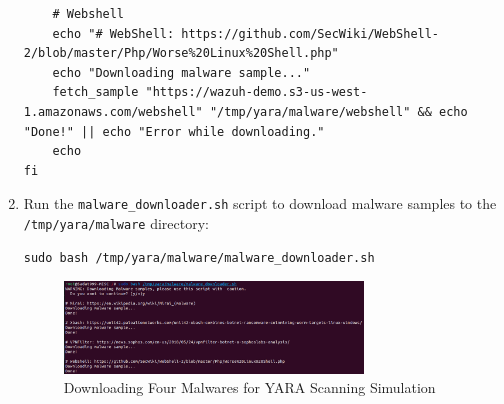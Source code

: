 \begin{enumerate}
\begin{verbatim}
    # Webshell
    echo "# WebShell: https://github.com/SecWiki/WebShell-2/blob/master/Php/Worse%20Linux%20Shell.php"
    echo "Downloading malware sample..."
    fetch_sample "https://wazuh-demo.s3-us-west-1.amazonaws.com/webshell" "/tmp/yara/malware/webshell" && echo "Done!" || echo "Error while downloading."
    echo
fi
    \end{verbatim}
    \item Run the \texttt{malware\_downloader.sh} script to download malware samples to the \texttt{/tmp/yara/malware} directory:
    \begin{verbatim}
sudo bash /tmp/yara/malware/malware_downloader.sh
    \end{verbatim}
    \begin{figure}[H]
        \centering
        \includegraphics[width=0.75\textwidth]{images/malware-detection/yara/5.png}
        \caption{Downloading Four Malwares for YARA Scanning Simulation}
        \label{fig:yara-malware-download}
    \end{figure}
\end{enumerate}

